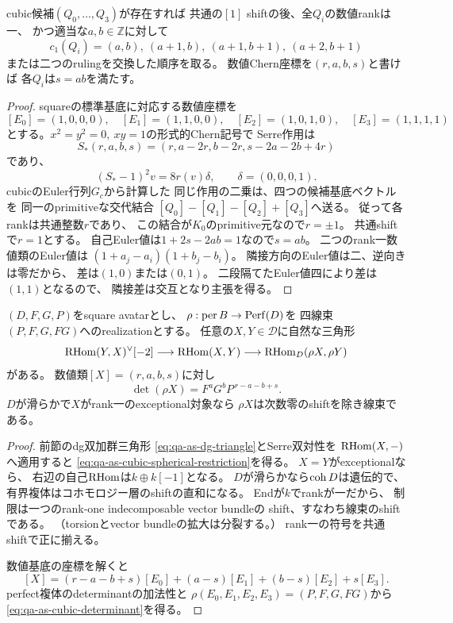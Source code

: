 \begin{lemma}[cubic候補のrankと数値線束型]
\label{lem:qa-as-cubic-candidate-numerical}
cubic候補$(Q_0,\ldots,Q_3)$が存在すれば
共通の$[1]$ shiftの後、全$Q_i$の数値rankは一、
かつ適当な$a,b\in\mathbb Z$に対して
\[
c_1(Q_i)=(a,b),\ (a+1,b),\
(a+1,b+1),\ (a+2,b+1)
\]
または二つのrulingを交換した順序を取る。
数値Chern座標を$(r,a,b,s)$と書けば
各$Q_i$は$s=ab$を満たす。
\end{lemma}
\begin{proof}
squareの標準基底に対応する数値座標を
\[
[E_0]=(1,0,0,0),\quad [E_1]=(1,1,0,0),\quad
[E_2]=(1,0,1,0),\quad [E_3]=(1,1,1,1)
\]
とする。$x^2=y^2=0,\ xy=1$の形式的Chern記号で
Serre作用は
\[
S_*(r,a,b,s)=(r,a-2r,b-2r,s-2a-2b+4r)
\]
であり、
\[
(S_*-1)^2v=8r(v)\delta,\qquad
\delta=(0,0,0,1).
\]
cubicのEuler行列$G_c$から計算した
同じ作用の二乗は、四つの候補基底ベクトルを
同一のprimitiveな交代結合
$[Q_0]-[Q_1]-[Q_2]+[Q_3]$へ送る。
従って各rankは共通整数$r$であり、
この結合が$K_0$のprimitive元なので$r=\pm1$。
共通shiftで$r=1$とする。
自己Euler値は$1+2s-2ab=1$なので$s=ab$。
二つのrank一数値類のEuler値は
$(1+a_j-a_i)(1+b_j-b_i)$。
隣接方向のEuler値は二、逆向きは零だから、
差は$(1,0)$または$(0,1)$。
二段隔てたEuler値四により差は$(1,1)$となるので、
隣接差は交互となり主張を得る。
\end{proof}

\begin{lemma}[曲線への制限とdeterminant]
\label{lem:qa-as-cubic-restriction-determinant}
$(D,F,G,P)$をsquare avatarとし、
$\rho:\operatorname{per}B\to\operatorname{Perf}(D)$を
四線束$(P,F,G,FG)$へのrealizationとする。
任意の$X,Y\in\mathcal D$に自然な三角形
\begin{equation}
\operatorname{RHom}(Y,X)^\vee[-2]\longrightarrow
\operatorname{RHom}(X,Y)\longrightarrow
\operatorname{RHom}_D(\rho X,\rho Y)
\label{eq:qa-as-cubic-spherical-restriction}
\end{equation}
がある。
数値類$[X]=(r,a,b,s)$に対し
\begin{equation}
\det(\rho X)=F^aG^bP^{\,r-a-b+s}.
\label{eq:qa-as-cubic-determinant}
\end{equation}
$D$が滑らかで$X$がrank一のexceptional対象なら
$\rho X$は次数零のshiftを除き線束である。
\end{lemma}
\begin{proof}
前節のdg双加群三角形
\eqref{eq:qa-as-dg-triangle}とSerre双対性を
$\operatorname{RHom}(X,-)$へ適用すると
\eqref{eq:qa-as-cubic-spherical-restriction}を得る。
$X=Y$がexceptionalなら、
右辺の自己$\operatorname{RHom}$は$k\oplus k[-1]$となる。
$D$が滑らかなら$\operatorname{coh} D$は遺伝的で、
有界複体はコホモロジー層のshiftの直和になる。
Endが$k$でrankが一だから、
制限は一つのrank-one indecomposable vector bundleの
shift、すなわち線束のshiftである。
（torsionとvector bundleの拡大は分裂する。）
rank一の符号を共通shiftで正に揃える。

数値基底の座標を解くと
\[
[X]=(r-a-b+s)[E_0]+(a-s)[E_1]
 +(b-s)[E_2]+s[E_3].
\]
perfect複体のdeterminantの加法性と
$\rho(E_0,E_1,E_2,E_3)=(P,F,G,FG)$から
\eqref{eq:qa-as-cubic-determinant}を得る。
\end{proof}

